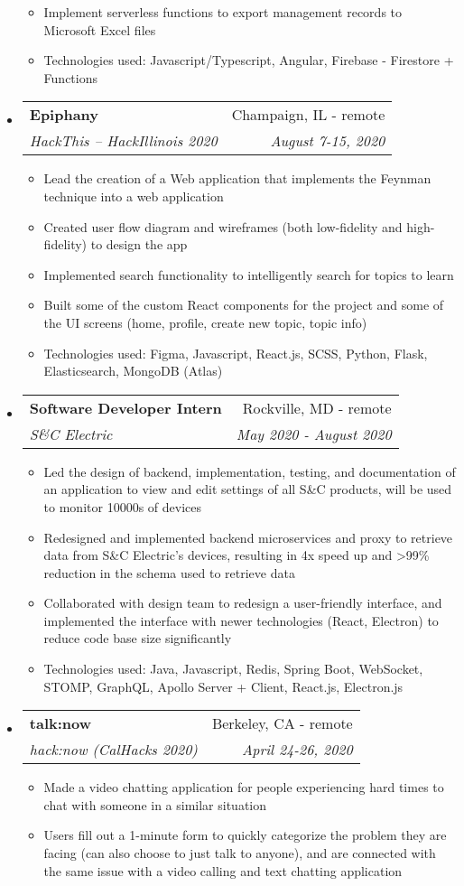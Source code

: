 \documentclass[letterpaper,11pt]{article}
\makeatletter
\newcommand{\resitem}[1]{\item #1 \vspace{-2pt}}
\newcommand{\ressubheading}[4]{
\begin{tabular*}{7.0in}{l@{\extracolsep{\fill}}r}
		\textbf{#1} & #2 \\
		\textit{#3} & \textit{#4} \\
\end{tabular*}\vspace{-6pt}}
\makeatother
\begin{document}
\begin{itemize}
\begin{itemize}
        \resitem{Implement serverless functions to export management records to Microsoft Excel files}
        \resitem{Technologies used: Javascript/Typescript, Angular, Firebase - Firestore + Functions}
    \end{itemize}
\item
    \ressubheading{Epiphany}{Champaign, IL - remote}{HackThis -- HackIllinois 2020}{August 7-15, 2020}
    \begin{itemize}
        \resitem{Lead the creation of a Web application that implements the Feynman technique into a web application}
        \resitem{Created user flow diagram and wireframes (both low-fidelity and high-fidelity) to design the app}
        \resitem{Implemented search functionality to intelligently search for topics to learn}
        \resitem{Built some of the custom React components for the project and some of the UI screens (home, profile, create new topic, topic info)}
        \resitem{Technologies used: Figma, Javascript, React.js, SCSS, Python, Flask, Elasticsearch, MongoDB (Atlas)}
    \end{itemize}
\item
    \ressubheading{Software Developer Intern}{Rockville, MD - remote}{S\&C Electric}{May 2020 - August 2020}
    \begin{itemize}
        \resitem{Led the design of backend, implementation, testing, and documentation of an application to view and edit settings of all S\&C products, will be used to monitor 10000s of devices}
        \resitem{Redesigned and implemented backend microservices and proxy to retrieve data from S\&C Electric's devices, resulting in 4x speed up and >99\% reduction in the schema used to retrieve data}
        \resitem{Collaborated with design team to redesign a user-friendly interface, and implemented the interface with newer technologies (React, Electron) to reduce code base size significantly}
        \resitem{Technologies used: Java, Javascript, Redis, Spring Boot, WebSocket, STOMP, GraphQL, Apollo Server + Client, React.js, Electron.js}
    \end{itemize}
\item
    \ressubheading{talk:now}{Berkeley, CA - remote}{hack:now (CalHacks 2020)}{April 24-26, 2020}
    \begin{itemize}
        \resitem{Made a video chatting application for people experiencing hard times to chat with someone in a similar situation}
        \resitem{Users fill out a 1-minute form to quickly categorize the problem they are facing (can also choose to just talk to anyone), and are connected with the same issue with a video calling and text chatting application}

\end{itemize}
\end{itemize}
\end{document}
